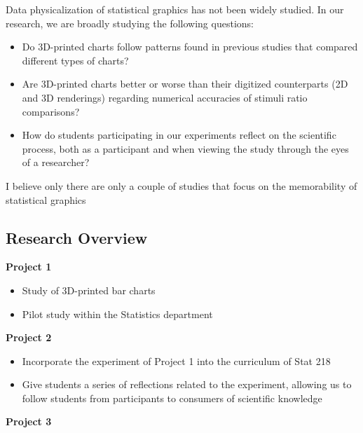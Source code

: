 \documentclass[phd]{nuthesis}
\begin{document}
Data physicalization of statistical graphics has not been widely
studied. In our research, we are broadly studying the following
questions:

\begin{itemize}
\tightlist
\item
  Do 3D-printed charts follow patterns found in previous studies that
  compared different types of charts?
\end{itemize}

\begin{itemize}
\tightlist
\item
  Are 3D-printed charts better or worse than their digitized
  counterparts (2D and 3D renderings) regarding numerical accuracies of
  stimuli ratio comparisons?
\end{itemize}

\begin{itemize}
\tightlist
\item
  How do students participating in our experiments reflect on the
  scientific process, both as a participant and when viewing the study
  through the eyes of a researcher?
\end{itemize}

I believe only there are only a couple of studies that focus on the
memorability of statistical graphics

\subsection{Research Overview}\label{research-overview}

\textbf{Project 1}

\begin{itemize}
\tightlist
\item
  Study of 3D-printed bar charts
\item
  Pilot study within the Statistics department
\end{itemize}

\textbf{Project 2}

\begin{itemize}
\tightlist
\item
  Incorporate the experiment of Project 1 into the curriculum of Stat
  218
\item
  Give students a series of reflections related to the experiment,
  allowing us to follow students from participants to consumers of
  scientific knowledge
\end{itemize}

\textbf{Project 3}
\end{document}
